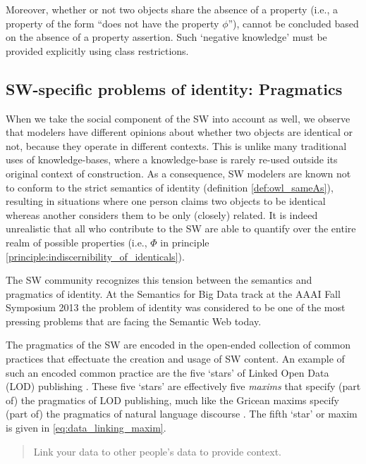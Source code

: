 Moreover, whether or not two objects share the absence of a property
  (i.e., a property of the form ``does not have the property $\phi$''),
  cannot be concluded based on the absence of a property assertion.
Such `negative knowledge' must be provided explicitly
  using class restrictions.

\subsection{SW-specific problems of identity: Pragmatics}

When we take the social component of the SW into account as well,
  we observe that modelers have different opinions about
  whether two objects are identical or not,
  because they operate in different contexts.
This is unlike many traditional uses of knowledge-bases,
  where a knowledge-base is rarely re-used outside its original
  context of construction.
As a consequence, SW modelers are known not to conform to
  the strict semantics of identity (definition \ref{def:owl_sameAs}),
  resulting in situations where one person
  claims two objects to be identical
  whereas another considers them to be only (closely) related.
It is indeed unrealistic that all who contribute to the SW
  are able to quantify over the entire realm of possible properties
  (i.e., $\Phi$ in principle \ref{principle:indiscernibility_of_identicals}).

The SW community recognizes this tension between
  the semantics and pragmatics of identity.
At the Semantics for Big Data track at the AAAI Fall Symposium 2013
  \cite{SemanticsBigData2013}
  the problem of identity was considered to be one of the most
  pressing problems that are facing the Semantic Web today.

The pragmatics of the SW are encoded in the open-ended collection of
  common practices that effectuate the creation and usage of SW content.
An example of such an encoded common practice are the five `stars'
  of Linked Open Data (LOD) publishing \cite{Bernerslee2010}.
These five `stars' are effectively five \emph{maxims} that specify
  (part of) the pragmatics of LOD publishing,
  much like the Gricean maxims specify
  (part of) the pragmatics of natural language discourse \cite{Grice1989}.
The fifth `star' or maxim is given in \ref{eq:data_linking_maxim}.
\begin{principle}
  \label{eq:data_linking_maxim}
  \begin{quote}
    Link your data to other people's data to provide context.
  \end{quote}
\end{principle}

